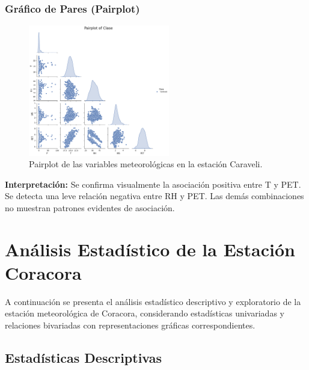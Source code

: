 \subsubsection*{Gráfico de Pares (Pairplot)}
\begin{figure}[H]
\centering
\includegraphics[width=0.55\textwidth]{resultados/por_estacion_meteorologica/Caraveli/pairplot.png}
\caption{Pairplot de las variables meteorológicas en la estación Caraveli.}
\label{fig:caraveli_pairplot}
\end{figure}
\textbf{Interpretación:} Se confirma visualmente la asociación positiva entre T y PET. Se detecta una leve relación negativa entre RH y PET. Las demás combinaciones no muestran patrones evidentes de asociación.




\section{Análisis Estadístico de la Estación Coracora}

A continuación se presenta el análisis estadístico descriptivo y exploratorio de la estación meteorológica de Coracora, considerando estadísticas univariadas y relaciones bivariadas con representaciones gráficas correspondientes.

\subsection{Estadísticas Descriptivas}

